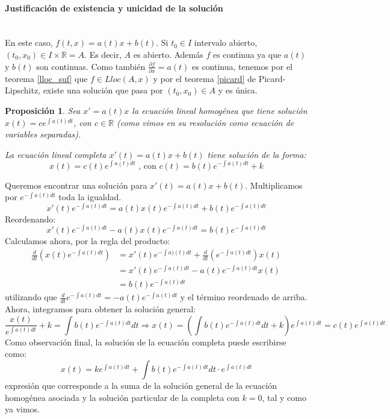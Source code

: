 \documentclass[11pt, a4paper,twoside]{article}
\makeatletter
\theoremstyle{theorem-style}  %
\newtheorem{proposition}[theorem]{Proposición}
\renewenvironment{proof}[1][\proofname]{\par
	\pushQED{\qed}%
	\normalfont \topsep6\p@\@plus6\p@\relax
	\list{}{%
		\settowidth{\leftmargin}{\quad:\hskip\labelsep}%
		\setlength{\labelwidth}{0pt}%
		\setlength{\itemindent}{-\leftmargin}%
	}%
	\item[\hskip\labelsep\itshape#1\@addpunct{:}]\ignorespaces
}{%
	\popQED\endlist\@endpefalse
}
\theoremstyle{definition-style}
\theoremstyle{example-style}
\makeatother
\begin{document}
\paragraph{Justificación de existencia y unicidad de la solución}\ \\
En este caso, $ f(t,x)=a(t)x+b(t) $. Si $ t_0\in I $ intervalo abierto, $ (t_0, x_0)\in I\times \mathbb{R}=A $. Es decir, $ A $ es abierto. Además $ f $ es continua ya que $ a(t) $ y $ b(t) $ son continuas. Como también $ \frac{\partial f}{\partial x}=a(t) $ es continua, tenemos por el teorema \ref{lloc_suf} que $ f\in L{loc}(A,x) $ y por el teorema \ref{picard} de Picard-Lipschitz, existe una solución que pasa por $ (t_0, x_0)\in A$ y es única.

\begin{proposition}\label{ecLinCompleta}
	Sea $ x'=a(t)x $ la ecuación lineal homogénea que tiene solución $ x(t)=c e^{\int a(t) dt} $, con $ c\in \mathbb{R} $ (como vimos en su resolución como ecuación de variables separadas). 
	
	La ecuación lineal completa $ x'(t)=a(t)x+b(t) $ tiene solución de la forma: \[ x(t)= c(t)e^{\int a(t) dt}\text{ , con } c(t)= b(t)e^{-\int a(t) dt}+k\]
\end{proposition}
\begin{proof}
	Queremos encontrar una solución para $ x'(t)=a(t)x+b(t) $. Multiplicamos por $ e^{-\int a(t)dt} $  toda la igualdad.
	\[ x'(t)e^{-\int a(t)dt}=a(t)x(t)e^{-\int a(t)dt}+b(t)e^{-\int a(t)dt}\]
	Reordenando:
	\[  x'(t)e^{-\int a(t)dt}-a(t)x(t)e^{-\int a(t)dt}=b(t)e^{-\int a(t)dt} \]
	Calculamos ahora, por la regla del producto:	
	\[ \begin{split}
	\frac{d}{dt}\left( x(t)e^{-\int a(t)dt}\right) &=x'(t)e^{-\int a)(t)dt}+\frac{d}{dt}\left( e^{-\int a(t)dt}\right) x(t)\\
	&=x'(t)e^{-\int a(t)dt}-a(t)e^{-\int a(t)dt}x(t)\\
	&=b(t)e^{-\int a(t)dt}
	\end{split} \]
	utilizando que $ \frac{d}{dt}e^{-\int a(t)dt}=-a(t)e^{-\int a(t)dt} $ y el término reordenado de arriba.
	Ahora, integramos para obtener la solución general:
	\[ \frac{x(t)}{e^{\int a(t)dt}}+k= \int b(t)e^{-\int a(t)dt} dt\Rightarrow x(t)= \left( \int b(t)e^{-\int a(t)dt} dt+k\right) e^{\int a(t)dt}=c(t)e^{\int a(t)dt} \]
	Como observación final, la solución de la ecuación completa puede escribirse como:
	\[ x(t)= ke^{\int a(t)dt}+\int b(t)e^{-\int a(t)dt} dt\cdot e^{\int a(t)dt} \]
	 expresión que corresponde a la suma de la solución general de la ecuación homogénea asociada y la solución particular de la completa con $ k=0 $, tal y como ya vimos.
\end{proof}
\end{document}
